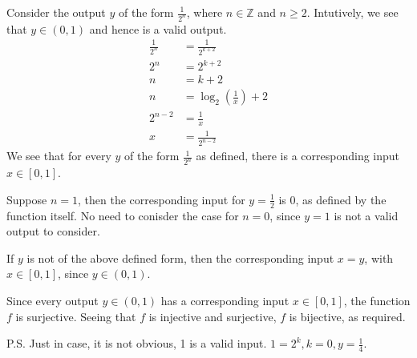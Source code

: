 \documentclass{article}
\renewcommand{\(}{\left(}
\renewcommand{\)}{\right)}
\theoremstyle{plain}
\theoremstyle{plain}
\theoremstyle{definition}
\begin{document}
\begin{shaded}
    Consider the output $y$ of the form $\frac{1}{2^{n}}$, where $n\in\mathbb{Z}$ and $n\geq2$. Intutively, we see that $y\in(0,1)$ and hence is a valid output.
    $$
        \begin{aligned}
            \frac{1}{2^{n}} &= \frac{1}{2^{k+2}} \\
            2^{n} &= 2^{k+2} \\
            n &= k+2 \\
            n &=\log_{2}(\frac{1}{x}) + 2 \\
            2^{n-2} &= \frac{1}{x} \\
            x &= \frac{1}{2^{n-2}}
        \end{aligned}
    $$
    We see that for every $y$ of the form $\frac{1}{2^{n}}$ as defined, there is a corresponding input $x\in[0,1]$.

    \vspace{4mm}

    Suppose $n=1$, then the corresponding input for $y=\frac{1}{2}$ is 0, as defined by the function itself. No need to conisder the case for $n=0$, since $y=1$ is not a valid output to consider.

    \vspace{4mm}

    If $y$ is not of the above defined form, then the corresponding input $x=y$, with $x\in[0,1]$, since $y\in(0,1)$.

    \vspace{4mm}

    Since every output $y\in(0,1)$ has a corresponding input $x\in[0,1]$, the function $f$ is surjective. Seeing that $f$ is injective and surjective, $f$ is bijective, as required.

    \vspace{4mm}

    P.S. Just in case, it is not obvious, 1 is a valid input. $1=2^{k},k=0,y=\frac{1}{4}$.
\end{shaded}
    
\end{document}
